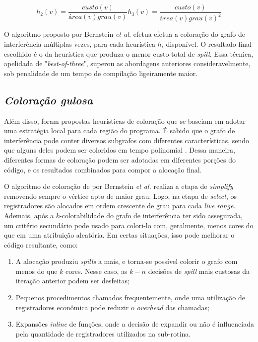 \documentclass[
	12pt,				%
	openright,			%
	oneside,			%
	a4paper,			%
	tccpreliminar,			%
	]{ABNT-DC-UEL}
\begin{document}
\begin{subequations}
    \begin{equation}
        h_2(v) = \frac{\textit{custo}(v)}
                      {\textit{área}(v)\textit{grau}(v)}
        \label{bernstein-2}
    \end{equation}
    \begin{equation}
        h_3(v) = \frac{\textit{custo}(v)}
                      {\textit{área}(v)\textit{grau}(v)^2}
        \label{bernstein-3}
    \end{equation}
    \label{bernstein-2_3}
\end{subequations}

O algoritmo proposto por Bernstein \textit{et al.} efetua efetua a coloração do grafo de interferência múltiplas vezes, para cada heurística $h_i$ disponível. O resultado final escolhido é o da heurística que produza o menor custo total de \textit{spill}. Essa técnica, apelidada de "\textit{best-of-three}", superou as abordagens anteriores consideravelmente, sob penalidade de um tempo de compilação ligeiramente maior.

\subsection{\textit{Coloração gulosa}}

Além disso, foram propostas heurísticas de coloração que se baseiam em adotar uma estratégia local para cada região do programa. É sabido que o grafo de interferência pode conter diversos subgrafos com diferentes características, sendo que alguns deles podem ser coloridos em tempo polinomial \cite{golumbic:04, dagan:88}. Dessa maneira, diferentes formas de coloração podem ser adotadas em diferentes porções do código, e os resultados combinados para compor a alocação final.

O algoritmo de coloração de por Bernstein \textit{et al.} realiza a etapa de \textit{simplify} removendo sempre o vértice apto de maior grau. Logo, na etapa de \textit{select}, os registradores são alocados em ordem crescente de grau para cada \textit{live range}. Ademais, após a $k$-colorabilidade do grafo de interferência ter sido assegurada, um critério secundário pode usado para colori-lo com, geralmente, menos cores do que em uma atribuição aleatória. Em certas situações, isso pode melhorar o código resultante, como:

\begin{enumerate}
    \item A alocação produziu \textit{spills} a mais, e torna-se possível colorir o grafo com menos do que $k$ cores. Nesse caso, as $k - n$ decisões de \textit{spill} mais custosas da iteração anterior podem ser desfeitas;
    \item Pequenos procedimentos chamados frequentemente, onde uma utilização de registradores econômica pode reduzir o \textit{overhead} das chamadas;
    \item Expansões \textit{inline} de funções, onde a decisão de expandir ou não é influenciada pela quantidade de registradores utilizados na sub-rotina.
\end{enumerate}
\end{document}
